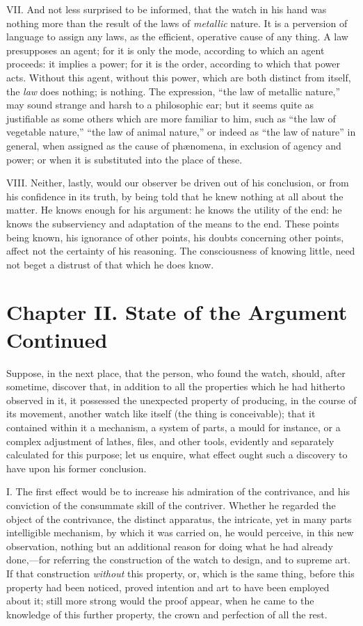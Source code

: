 VII. And not less surprised to be informed, that the watch in his hand
was nothing more than the result of the laws of \textit{metallic}
nature. It is a perversion of language to assign any laws, as the
efficient, operative cause of any thing. A law presupposes an agent;
for it is only the mode, according to which an agent proceeds: it
implies a power; for it is the order, according to which that power
acts. Without this agent, without this power, which are both distinct
from itself, the \textit{law} does nothing; is nothing. The
expression, ``the law of metallic nature,'' may sound strange and
harsh to a philosophic ear; but it seems quite as justifiable as some
others which are more familiar to him, such as ``the law of vegetable
nature,'' ``the law of animal nature,'' or indeed as ``the law of
nature'' in general, when assigned as the cause of ph{\ae}nomena, in
exclusion of agency and power; or when it is substituted into the
place of these.

VIII. Neither, lastly, would our observer be driven out of his
conclusion, or from his confidence in its truth, by being told that he
knew nothing at all about the matter. He  knows enough for his
argument: he knows the utility of the end: he knows the subserviency
and adaptation of the means to the end. These points being known, his
ignorance of other points, his doubts concerning other points,
affect not the certainty of his reasoning. The consciousness of
knowing little, need not beget a distrust of that which he does
know.

\section{Chapter II. State of the Argument Continued}

Suppose, in the next place, that the person, who found the watch,
should, after sometime, discover that, in addition to all the
properties which he had hitherto observed in it, it possessed the
unexpected property of producing, in the course of its movement,
another watch like itself (the thing is conceivable); that it
contained within it a mechanism, a system of parts, a mould for
instance, or a complex adjustment of lathes, files, and other tools,
evidently and separately calculated for this purpose; let us
enquire, what effect ought such a discovery to have upon his former
conclusion.

I. The first effect would be to increase his admiration of the
contrivance, and his conviction of the consummate skill of the
contriver. Whether he regarded the object of the contrivance, the
distinct apparatus, the intricate, yet in many parts intelligible
mechanism, by which it was carried on, he would perceive, in this new
observation, nothing but an additional reason for doing what he had
already done,---for referring the construction of the watch to design,
and to supreme art. If that construction \textit{without} this
property, or, which is the same thing, before this property had been
noticed, proved intention and art to have been employed about it;
still more strong would the proof appear, when he came to the
knowledge of this further property, the crown and perfection of all
the rest.

